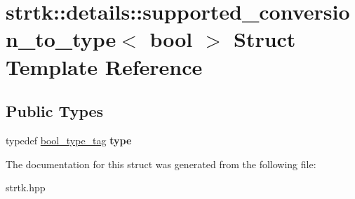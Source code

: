 \hypertarget{structstrtk_1_1details_1_1supported__conversion__to__type_3_01bool_01_4}{\section{strtk\-:\-:details\-:\-:supported\-\_\-conversion\-\_\-to\-\_\-type$<$ bool $>$ Struct Template Reference}
\label{structstrtk_1_1details_1_1supported__conversion__to__type_3_01bool_01_4}
}
\subsection*{Public Types}
\begin{DoxyCompactItemize}
\item 
\hypertarget{structstrtk_1_1details_1_1supported__conversion__to__type_3_01bool_01_4_a76a6b12e254677f5255ee7defe2004a1}{typedef \hyperlink{structstrtk_1_1details_1_1bool__type__tag}{bool\-\_\-type\-\_\-tag} {\bfseries type}}\label{structstrtk_1_1details_1_1supported__conversion__to__type_3_01bool_01_4_a76a6b12e254677f5255ee7defe2004a1}

\end{DoxyCompactItemize}


The documentation for this struct was generated from the following file\-:\begin{DoxyCompactItemize}
\item 
strtk.\-hpp\end{DoxyCompactItemize}
